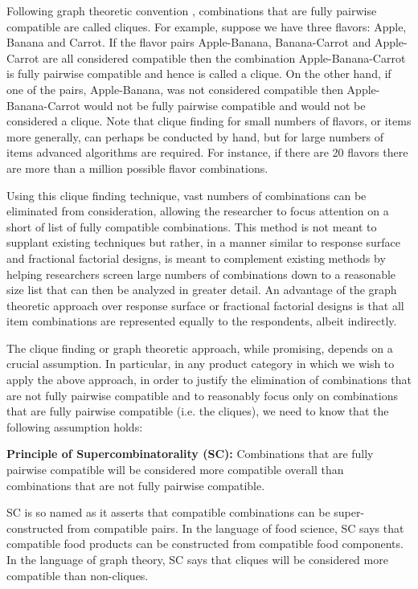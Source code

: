 Following graph theoretic convention \citep{Moon1965}, combinations that are fully pairwise compatible are called cliques.  For example, suppose we have three flavors: Apple, Banana and Carrot.  If the flavor pairs Apple-Banana, Banana-Carrot and Apple-Carrot are all considered compatible then the combination Apple-Banana-Carrot is fully pairwise compatible and hence is called a clique.  On the other hand, if one of the pairs, Apple-Banana, was not considered compatible then Apple-Banana-Carrot would not be fully pairwise compatible and would not be considered a clique.  Note that clique finding for small numbers of flavors, or items more generally, can perhaps be conducted by hand, but for large numbers of items advanced algorithms are required.  For instance, if there are 20 flavors there are more than a million possible flavor combinations.

Using this clique finding technique, vast numbers of combinations can be eliminated from consideration, allowing the researcher to focus attention on a short of list of fully compatible combinations.  This method is not meant to supplant existing techniques but rather, in a manner similar to response surface \citep{Mullen1979} and fractional factorial \citep{Mullen1985} designs, is meant to complement existing methods by helping researchers screen large numbers of combinations down to a reasonable size list that can then be analyzed in greater detail.  An advantage of the graph theoretic approach over response surface or fractional factorial designs is that all item combinations are represented equally to the respondents, albeit indirectly.  

The clique finding or graph theoretic approach, while promising, depends on a crucial assumption.  In particular, in any product category in which we wish to apply the above approach, in order to justify the elimination of combinations that are not fully pairwise compatible and to reasonably focus only on combinations that are fully pairwise compatible (i.e. the cliques), we need to know that the following assumption holds:

\noindent
{\bf Principle of Supercombinatorality (SC):} Combinations that are fully pairwise compatible will be considered more compatible overall than combinations that are not fully pairwise compatible.

SC is so named as it asserts that compatible combinations can be super-constructed from compatible pairs.  In the language of food science, SC says that compatible food products can be constructed from compatible food components.  In the language of graph theory, SC says that cliques will be considered more compatible than non-cliques.


